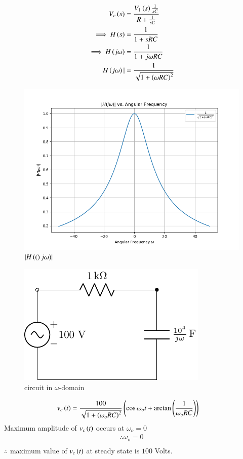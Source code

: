 \documentclass[journal,12pt,twocolumn]{IEEEtran}
\theoremstyle{remark}
\begin{document}
\begin{align}
V_c\left(s\right)&= \frac{V_1\left(s\right)\frac{1}{sC}}{R+\frac{1}{sC}}\\
\implies H\left(s\right) &= \frac{1}{1+ sRC}\\
\implies H\left(j\omega\right) &= \frac{1}{1+j\omega RC}\\
|H\left(j\omega\right)| &= \frac{1}{\sqrt{1+\left(\omega RC\right)^2}}
\end{align}
\begin{figure}[h!]
    \includegraphics[width = \columnwidth]{figs/Figure_1.png}
    \caption{$ |H\left((\right)j\omega)|$ }
    \centering
    \label{fig: bm_16_fig_2}
\end{figure}


\begin{figure}[h!]
    \includegraphics[width = \columnwidth]{figs/c_fig2.pdf}
    \caption{circuit in $ \omega$-domain }
    \centering
    \label{fig: bm_16_fig_3}
\end{figure}

\begin{align}
v_c\left(t\right)&= \frac{100}{\sqrt{1+\left(\omega_o RC\right)^2}}\left(\cos{\omega_o t + \arctan\ensuremath{\left(\frac{1}{\omega_o RC}\right)}}\right)
\end{align}
Maximum amplitude of $ v_c\left(t\right)$ occurs at $ \omega_o=0$
\begin{align}
\therefore \omega_o =0\\
\end{align}
$ \therefore$ maximum value of $ v_c\left(t\right)$ at steady state is $ 100$ Volts.
\end{document}
